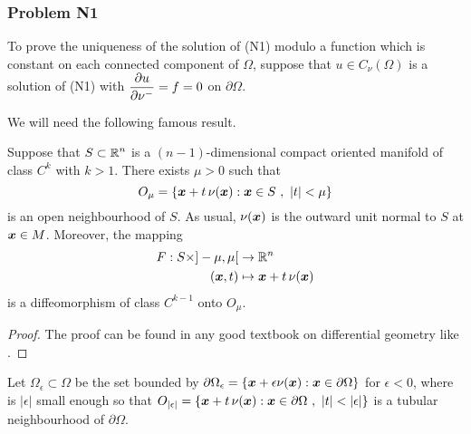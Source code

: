 \subsubsection{Problem N1}
To prove the uniqueness of the solution of (N1) modulo a
function which is constant on each connected component of $\Omega$,
suppose that $u \in C_{\nu}(\Omega)$ is a solution of
(N1) with $\displaystyle \frac{\partial{u}}{\partial \nu^-} = f = 0$ on
$\partial \Omega$.

We will need the following famous result.

\begin{theorem}\label{pot_TBN}
Suppose that $\displaystyle S \subset \mathbb{R}^n$ is a $(n-1)$-dimensional
compact oriented manifold of class $\displaystyle C^k$ with $k>1$.
There exists $\mu >0$ such that
\[
O_\mu = \left\{ {\bm{x}} + t\, \nu({\bm{x}}) : {\bm{x}} \in S \ ,
\ |t|<\mu \right\}
\]
is an open neighbourhood of $S$.  As usual, $\nu({\bm{x}})$ is
the outward unit normal to $S$ at ${\bm{x}} \in M$.  Moreover, the
mapping
\begin{align*}
F: S\times ]-\mu,\mu[ &\rightarrow \mathbb{R}^n \\
({\bm{x}}, t) &\mapsto {\bm{x}} + t\, \nu({\bm{x}})
\end{align*}
is a diffeomorphism of class $\displaystyle C^{k-1}$ onto $O_\mu$.
\end{theorem}

\begin{proof}
The proof can be found in any good textbook on differential geometry
like \cite{Ab,Sp}.
\end{proof}

Let $\Omega_\epsilon \subset \Omega$ be the set bounded by
$\partial \Omega_\epsilon = \{ {\bm{x}} + \epsilon \nu({\bm{x}}) : {\bm{x}}
\in \partial \Omega \}$ for $\epsilon<0$, where is $|\epsilon|$ small
enough so that
$\displaystyle
O_{|\epsilon|} = \left\{ \VEC{x} + t\, \nu(\VEC{x}) : \VEC{x} \in
  \partial \Omega \ , \ |t|<|\epsilon| \right\}$ is a tubular
neighbourhood of $\partial \Omega$.

